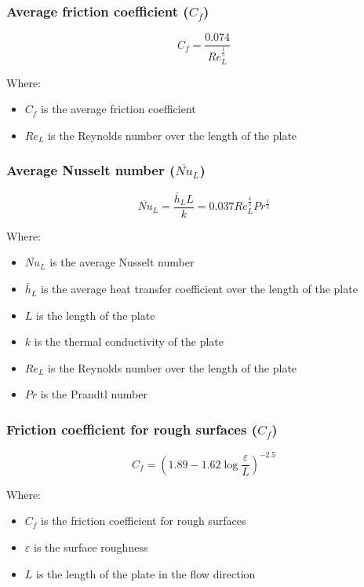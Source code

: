 \documentclass[11pt]{article}
\begin{document}
\subsubsection{Average friction coefficient (\(C_f\))}
\label{sec:orgfe6b05c}
\[C_f = \frac{0.074}{Re_L^{\frac{1}{5}}}\]

Where:
\begin{itemize}
\item \(C_f\) is the average friction coefficient
\item \(Re_L\) is the Reynolds number over the length of the plate
\end{itemize}

\subsubsection{Average Nusselt number (\(\overline{Nu}_L\))}
\label{sec:orga218b36}
\[\overline{Nu}_L = \frac{\bar{h}_L L}{k} = 0.037 Re_L^{\frac{4}{5}} Pr^{\frac{1}{3}}\]

Where:
\begin{itemize}
\item \(\overline{Nu}_L\) is the average Nusselt number
\item \(\bar{h}_L\) is the average heat transfer coefficient over the length of the plate
\item \(L\) is the length of the plate
\item \(k\) is the thermal conductivity of the plate
\item \(Re_L\) is the Reynolds number over the length of the plate
\item \(Pr\) is the Prandtl number
\end{itemize}

\subsubsection{Friction coefficient for rough surfaces (\(C_f\))}
\label{sec:org4ce53c2}
\[C_f = \left(1.89 - 1.62 \log \frac{\varepsilon}{L} \right)^{-2.5}\]

Where:
\begin{itemize}
\item \(C_f\) is the friction coefficient for rough surfaces
\item \(\varepsilon\) is the surface roughness
\item \(L\) is the length of the plate in the flow direction
\end{itemize}

 \newpage
\end{document}
